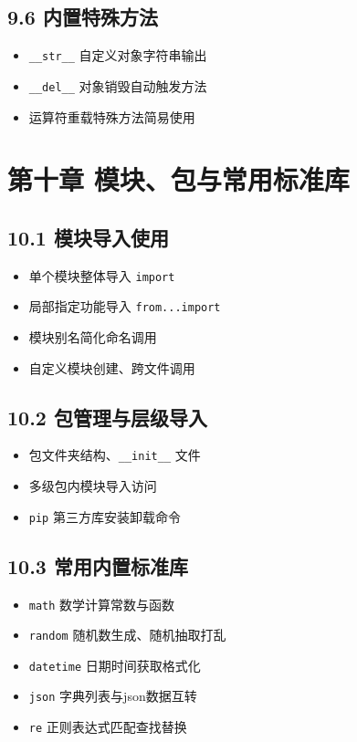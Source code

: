 \subsection{9.6 内置特殊方法}
\begin{itemize}
\item \texttt{\_\_str\_\_} 自定义对象字符串输出
\item \texttt{\_\_del\_\_} 对象销毁自动触发方法
\item 运算符重载特殊方法简易使用
\end{itemize}

\section{第十章 模块、包与常用标准库}
\subsection{10.1 模块导入使用}
\begin{itemize}
\item 单个模块整体导入 \texttt{import}
\item 局部指定功能导入 \texttt{from...import}
\item 模块别名简化命名调用
\item 自定义模块创建、跨文件调用
\end{itemize}

\subsection{10.2 包管理与层级导入}
\begin{itemize}
\item 包文件夹结构、\texttt{\_\_init\_\_} 文件
\item 多级包内模块导入访问
\item \texttt{pip} 第三方库安装卸载命令
\end{itemize}

\subsection{10.3 常用内置标准库}
\begin{itemize}
\item \texttt{math} 数学计算常数与函数
\item \texttt{random} 随机数生成、随机抽取打乱
\item \texttt{datetime} 日期时间获取格式化
\item \texttt{json} 字典列表与json数据互转
\item \texttt{re} 正则表达式匹配查找替换
\end{itemize}

